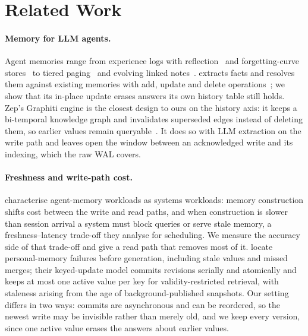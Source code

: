 \section{Related Work}
\label{sec:related}

\paragraph{Memory for LLM agents.}
Agent memories range from experience logs with reflection~\citep{park2023generative} and forgetting-curve stores~\citep{zhong2024memorybank} to tiered paging~\citep{packer2023memgpt} and evolving linked notes~\citep{xu2025amem}. \memzero{} extracts facts and resolves them against existing memories with add, update and delete operations~\citep{chhikara2025mem0}; we show that its in-place update erases answers its own history table still holds. Zep's Graphiti engine is the closest design to ours on the history axis: it keeps a bi-temporal knowledge graph and invalidates superseded edges instead of deleting them, so earlier values remain queryable~\citep{rasmussen2025zep}. It does so with LLM extraction on the write path and leaves open the window between an acknowledged write and its indexing, which the raw WAL covers.

\paragraph{Freshness and write-path cost.}
\citet{omri2026agentmemory} characterise agent-memory workloads as systems workloads: memory construction shifts cost between the write and read paths, and when construction is slower than session arrival a system must block queries or serve stale memory, a freshness--latency trade-off they analyse for scheduling. We measure the accuracy side of that trade-off and give a read path that removes most of it. \citet{deng2026stale} locate personal-memory failures before generation, including stale values and missed merges; their keyed-update model commits revisions serially and atomically and keeps at most one active value per key for validity-restricted retrieval, with staleness arising from the age of background-published snapshots. Our setting differs in two ways: commits are asynchronous and can be reordered, so the newest write may be invisible rather than merely old, and we keep every version, since one active value erases the answers about earlier values.

